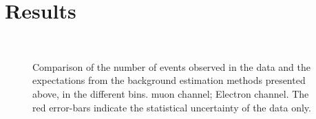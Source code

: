\section{Results}
\begin{figure}
\centering
{}\quad
{}\quad
{}\\
\quad
{}\quad
{}
\caption[]{}
\label{fig:susy_datamc}
\end{figure}

\begin{figure}[htb]
\centering
{}\quad
{}\quad
\caption{Comparison of the number of events observed in the data and the
  expectations from the background estimation methods presented above, in the
  different \STlep bins. muon channel;
   Electron channel.  The red error-bars indicate the
  statistical uncertainty of the data only.}
\label{fig:susy_pred}
\end{figure}